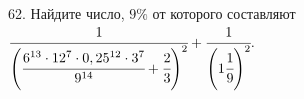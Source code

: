 62. Найдите число, $9\%$ от которого составляют $\cfrac{1}{\left(\cfrac{6^{13}\cdot12^7\cdot0,25^{12}\cdot3^7}{9^{14}}+\cfrac{2}{3}\right)^2}+\cfrac{1}{\left(1\cfrac{1}{9}\right)^2}.$\\

